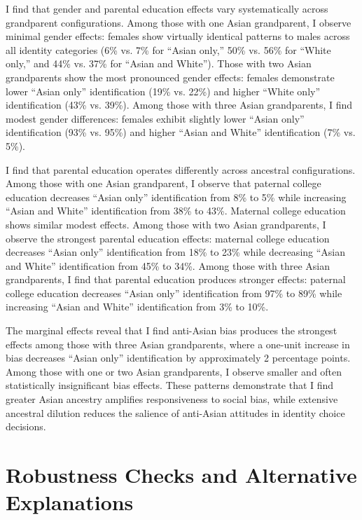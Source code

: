 I find that gender and parental education effects vary systematically across grandparent configurations. Among those with one Asian grandparent, I observe minimal gender effects: females show virtually identical patterns to males across all identity categories (6\% vs. 7\% for ``Asian only,'' 50\% vs. 56\% for ``White only,'' and 44\% vs. 37\% for ``Asian and White''). Those with two Asian grandparents show the most pronounced gender effects: females demonstrate lower ``Asian only'' identification (19\% vs. 22\%) and higher ``White only'' identification (43\% vs. 39\%). Among those with three Asian grandparents, I find modest gender differences: females exhibit slightly lower ``Asian only'' identification (93\% vs. 95\%) and higher ``Asian and White'' identification (7\% vs. 5\%). 

I find that parental education operates differently across ancestral configurations. Among those with one Asian grandparent, I observe that paternal college education decreases ``Asian only'' identification from 8\% to 5\% while increasing ``Asian and White'' identification from 38\% to 43\%. Maternal college education shows similar modest effects. Among those with two Asian grandparents, I observe the strongest parental education effects: maternal college education decreases ``Asian only'' identification from 18\% to 23\% while decreasing ``Asian and White'' identification from 45\% to 34\%. Among those with three Asian grandparents, I find that parental education produces stronger effects: paternal college education decreases ``Asian only'' identification from 97\% to 89\% while increasing ``Asian and White'' identification from 3\% to 10\%.

The marginal effects reveal that I find anti-Asian bias produces the strongest effects among those with three Asian grandparents, where a one-unit increase in bias decreases ``Asian only'' identification by approximately 2 percentage points. Among those with one or two Asian grandparents, I observe smaller and often statistically insignificant bias effects. These patterns demonstrate that I find greater Asian ancestry amplifies responsiveness to social bias, while extensive ancestral dilution reduces the salience of anti-Asian attitudes in identity choice decisions.

\section{Robustness Checks and Alternative Explanations}\label{sec:robcheck}

